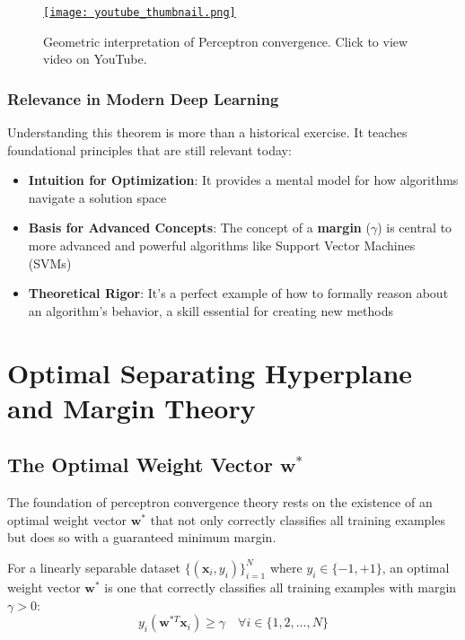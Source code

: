 \begin{figure}[h]
    \centering
    \href{https://youtu.be/lBzRw57xI9o}{
        \texttt{[image: youtube\_thumbnail.png]}
    }
    \caption{Geometric interpretation of Perceptron convergence. Click to view video on YouTube.}
    \label{fig:perceptron_convergence_video}
\end{figure}

\subsubsection{Relevance in Modern Deep Learning}

Understanding this theorem is more than a historical exercise. It teaches foundational principles that are still relevant today:

\begin{itemize}
    \item \textbf{Intuition for Optimization}: It provides a mental model for how algorithms navigate a solution space
    \item \textbf{Basis for Advanced Concepts}: The concept of a \textbf{margin} (\(\gamma\)) is central to more advanced and powerful algorithms like Support Vector Machines (SVMs)
    \item \textbf{Theoretical Rigor}: It's a perfect example of how to formally reason about an algorithm's behavior, a skill essential for creating new methods
\end{itemize}

\section{Optimal Separating Hyperplane and Margin Theory}

\subsection{The Optimal Weight Vector \(\mathbf{w}^*\)}

The foundation of perceptron convergence theory rests on the existence of an optimal weight vector \(\mathbf{w}^*\) that not only correctly classifies all training examples but does so with a guaranteed minimum margin.

\begin{definition}
For a linearly separable dataset \(\{(\mathbf{x}_i, y_i)\}_{i=1}^N\) where \(y_i \in \{-1, +1\}\), an optimal weight vector \(\mathbf{w}^*\) is one that correctly classifies all training examples with margin \(\gamma > 0\):
\[y_i(\mathbf{w}^{*T} \mathbf{x}_i) \geq \gamma \quad \forall i \in \{1, 2, \ldots, N\}\]
\end{definition}

